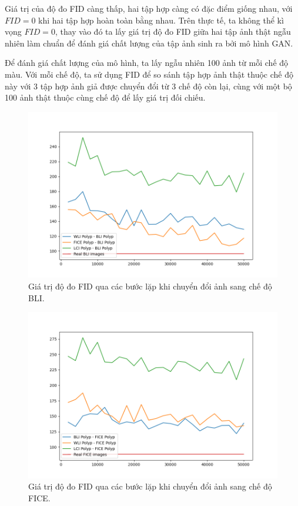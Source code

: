 \documentclass[12pt]{extreport}
\begin{document}
Giá trị của độ đo FID càng thấp, hai tập hợp càng có đặc điểm giống nhau, với $ FID = 0 $ khi hai tập hợp hoàn toàn bằng nhau. Trên thực tế, ta không thể kì vọng $ FID = 0 $, thay vào đó ta lấy giá trị độ đo FID giữa hai tập ảnh thật ngẫu nhiên làm chuẩn để đánh giá chất lượng của tập ảnh sinh ra bởi mô hình GAN.

Để đánh giá chất lượng của mô hình, ta lấy ngẫu nhiên 100 ảnh từ mỗi chế độ màu. Với mỗi chế độ, ta sử dụng FID để so sánh tập hợp ảnh thật thuộc chế độ này với 3 tập hợp ảnh giả được chuyển đổi từ 3 chế độ còn lại, cùng với một bộ 100 ảnh thật thuộc cùng chế độ để lấy giá trị đối chiếu.

\begin{figure}[H]
    \centering
    \includegraphics[width=\linewidth]{fid/FID_BLI.png}
    \caption{Giá trị độ đo FID qua các bước lặp khi chuyển đổi ảnh sang chế độ BLI.}
\end{figure}

\begin{figure}[H]
    \centering
    \includegraphics[width=\linewidth]{fid/FID_FICE.png}
    \caption{Giá trị độ đo FID qua các bước lặp khi chuyển đổi ảnh sang chế độ FICE.}
\end{figure}
\end{document}
